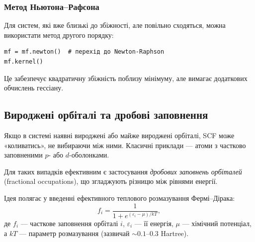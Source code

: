 %
%
%
%
%

\subsubsection{Метод Ньютона--Рафсона}

Для систем, які вже близькі до збіжності, але повільно сходяться, можна використати метод другого порядку:

\begin{verbatim}
mf = mf.newton()  # перехід до Newton-Raphson
mf.kernel()
\end{verbatim}

Це забезпечує квадратичну збіжність поблизу мінімуму, але вимагає додаткових обчислень гессіану.

\subsection{Вироджені орбіталі та дробові заповнення}

Якщо в системі наявні вироджені або майже вироджені орбіталі, SCF може «коливатись», не вибираючи між ними. Класичні приклади --- атоми з частково заповненими $p$- або $d$-оболонками.

Для таких випадків ефективним є застосування \textit{дробових заповнень орбіталей} (fractional occupations), що згладжують різницю між рівнями енергії.

Ідея полягає у введенні ефективного теплового розмазування Фермі--Дірака:
\[
f_i = \frac{1}{1 + e^{(\varepsilon_i - \mu)/kT}},
\]
де $f_i$ — часткове заповнення орбіталі $i$, $\varepsilon_i$ — її енергія, $\mu$ — хімічний потенціал, а $kT$ — параметр розмазування (зазвичай $\sim 0.1$--$0.3$ Hartree).

